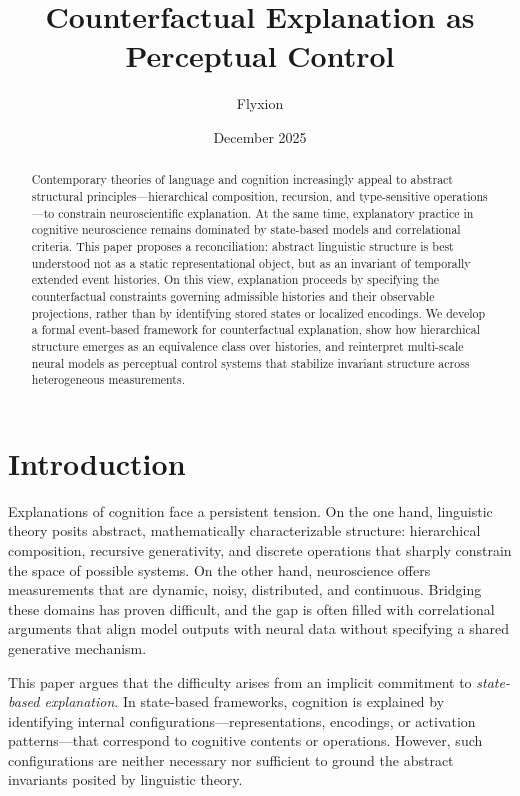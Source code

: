 \documentclass[11pt]{article}
\title{Counterfactual Explanation as Perceptual Control}
\author{Flyxion}
\date{December 2025}
\begin{document}
\maketitle

\begin{abstract}
Contemporary theories of language and cognition increasingly appeal to abstract structural principles---hierarchical composition, recursion, and type-sensitive operations---to constrain neuroscientific explanation. At the same time, explanatory practice in cognitive neuroscience remains dominated by state-based models and correlational criteria. This paper proposes a reconciliation: abstract linguistic structure is best understood not as a static representational object, but as an invariant of temporally extended event histories. On this view, explanation proceeds by specifying the counterfactual constraints governing admissible histories and their observable projections, rather than by identifying stored states or localized encodings. We develop a formal event-based framework for counterfactual explanation, show how hierarchical structure emerges as an equivalence class over histories, and reinterpret multi-scale neural models as perceptual control systems that stabilize invariant structure across heterogeneous measurements.
\end{abstract}

\section{Introduction}

Explanations of cognition face a persistent tension. On the one hand, linguistic theory posits abstract, mathematically characterizable structure: hierarchical composition, recursive generativity, and discrete operations that sharply constrain the space of possible systems. On the other hand, neuroscience offers measurements that are dynamic, noisy, distributed, and continuous. Bridging these domains has proven difficult, and the gap is often filled with correlational arguments that align model outputs with neural data without specifying a shared generative mechanism.

This paper argues that the difficulty arises from an implicit commitment to \emph{state-based explanation}. In state-based frameworks, cognition is explained by identifying internal configurations---representations, encodings, or activation patterns---that correspond to cognitive contents or operations. However, such configurations are neither necessary nor sufficient to ground the abstract invariants posited by linguistic theory.
\end{document}
